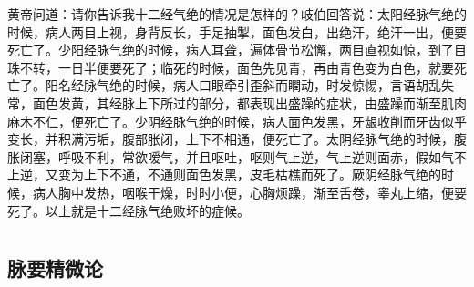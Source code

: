 \documentclass[a4paper,12pt,UTF8,twoside]{ctexbook}
\begin{document}
黄帝问道：请你告诉我十二经气绝的情况是怎样的？岐伯回答说：太阳经脉气绝的时候，病人两目上视，身背反长，手足抽掣，面色发白，出绝汗，绝汗一出，便要死亡了。少阳经脉气绝的时候，病人耳聋，遍体骨节松懈，两目直视如惊，到了目珠不转，一日半便要死了；临死的时候，面色先见青，再由青色变为白色，就要死亡了。阳名经脉气绝的时候，病人口眼牵引歪斜而瞤动，时发惊惕，言语胡乱失常，面色发黄，其经脉上下所过的部分，都表现出盛躁的症状，由盛躁而渐至肌肉麻木不仁，便死亡了。少阴经脉气绝的时候，病人面色发黑，牙龈收削而牙齿似乎变长，并积满污垢，腹部胀闭，上下不相通，便死亡了。太阴经脉气绝的时候，腹胀闭塞，呼吸不利，常欲嗳气，并且呕吐，呕则气上逆，气上逆则面赤，假如气不上逆，又变为上下不通，不通则面色发黑，皮毛枯樵而死了。厥阴经脉气绝的时候，病人胸中发热，咽喉干燥，时时小便，心胸烦躁，渐至舌卷，睾丸上缩，便要死了。以上就是十二经脉气绝败坏的症候。

\part{}

\chapter{脉要精微论}
\end{document}
